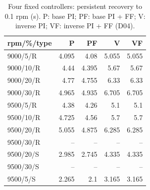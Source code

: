 \begin{table}[htbp]\centering\small\setlength{\tabcolsep}{4pt}\begin{tabular}{@{}lrrrr@{}}\toprule
rpm/\%/type & P & PF & V & VF\\\midrule
9000/5/R & 4.095 & 4.08 & 5.055 & 5.055\\
9000/10/R & 4.44 & 4.395 & 5.67 & 5.67\\
9000/20/R & 4.77 & 4.755 & 6.33 & 6.33\\
9000/30/R & 4.965 & 4.935 & 6.705 & 6.705\\
9500/5/R & 4.38 & 4.26 & 5.1 & 5.1\\
9500/10/R & 4.725 & 4.56 & 5.7 & 5.7\\
9500/20/R & 5.055 & 4.875 & 6.285 & 6.285\\
9500/30/R & -- & -- & -- & --\\
9500/20/S & 2.985 & 2.745 & 4.335 & 4.335\\
9500/30/S & -- & -- & -- & --\\
9500/5/S & 2.265 & 2.1 & 3.165 & 3.165\\
\bottomrule\end{tabular}\caption{Four fixed controllers: persistent recovery to 0.1 rpm (s). P: base PI; PF: base PI + FF; V: inverse PI; VF: inverse PI + FF (D04).}\label{tab:fixed_fine}\end{table}